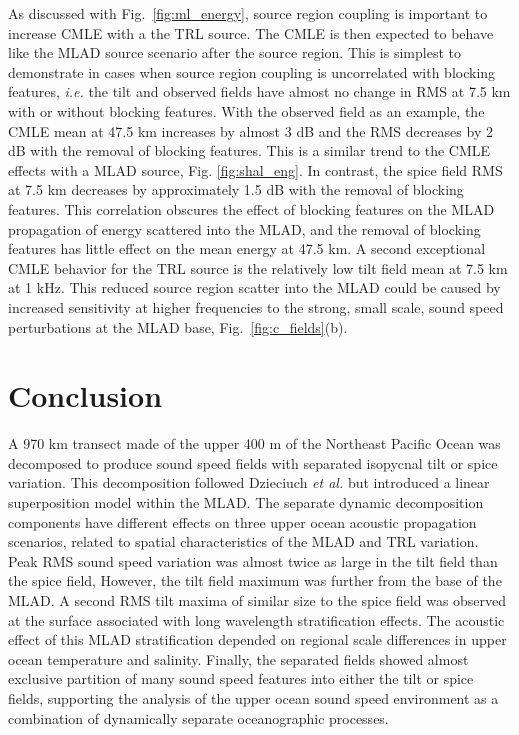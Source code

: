 \documentclass[preprint,NumberedRefs]{JASA}
\begin{document}
As discussed with Fig.~\ref{fig:ml_energy}, source region coupling is important to increase CMLE with a the TRL source. The CMLE is then expected to behave like the MLAD source scenario after the source region. This is simplest to demonstrate in cases when source region coupling is uncorrelated with blocking features, \emph{i.e.} the tilt and observed fields have almost no change in RMS at 7.5 km with or without blocking features. With the observed field as an example, the CMLE mean at 47.5 km increases by almost 3 dB and the RMS decreases by 2 dB with the removal of blocking features. This is a similar trend to the CMLE effects with a MLAD source, Fig. \ref{fig:shal_eng}. In contrast, the spice field RMS at 7.5 km decreases by approximately 1.5 dB with the removal of blocking features. This correlation obscures the effect of blocking features on the MLAD propagation of energy scattered into the MLAD, and the removal of blocking features has little effect on the mean energy at 47.5 km. A second exceptional CMLE behavior for the TRL source is the relatively low tilt field mean at 7.5 km at 1 kHz. This reduced source region scatter into the MLAD could be caused by increased sensitivity at higher frequencies to the strong, small scale, sound speed perturbations at the MLAD base, Fig.~\ref{fig:c_fields}(b).

\section{Conclusion}\label{sec:conclusion}
A 970 km transect made of the upper 400 m of the Northeast Pacific Ocean was decomposed to produce sound speed fields with separated isopycnal tilt or spice variation. This decomposition followed Dzieciuch \emph{et al.}\citep{dzieciuch2004} but introduced a linear superposition model within the MLAD. The separate dynamic decomposition components have different effects on three upper ocean acoustic propagation scenarios, related to spatial characteristics of the MLAD and TRL variation. Peak RMS sound speed variation was almost twice as large in the tilt field than the spice field, However, the tilt field maximum was further from the base of the MLAD. A second RMS tilt maxima of similar size to the spice field was observed at the surface associated with long wavelength stratification effects. The acoustic effect of this MLAD stratification depended on regional scale differences in upper ocean temperature and salinity. Finally, the separated fields showed almost exclusive partition of many sound speed features into either the tilt or spice fields, supporting the analysis of the upper ocean sound speed environment as a combination of dynamically separate oceanographic processes.
\end{document}
